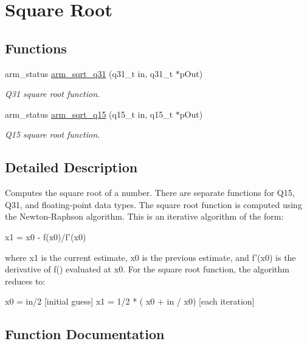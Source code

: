\hypertarget{group___s_q_r_t}{}\section{Square Root}
\label{group___s_q_r_t}
\subsection*{Functions}
\begin{DoxyCompactItemize}
\item 
arm\+\_\+status \hyperlink{group___s_q_r_t_ga119e25831e141d734d7ef10636670058}{arm\+\_\+sqrt\+\_\+q31} (q31\+\_\+t in, q31\+\_\+t $\ast$p\+Out)
\begin{DoxyCompactList}\small\item\em Q31 square root function. \end{DoxyCompactList}\item 
arm\+\_\+status \hyperlink{group___s_q_r_t_ga5abe5ca724f3e15849662b03752c1238}{arm\+\_\+sqrt\+\_\+q15} (q15\+\_\+t in, q15\+\_\+t $\ast$p\+Out)
\begin{DoxyCompactList}\small\item\em Q15 square root function. \end{DoxyCompactList}\end{DoxyCompactItemize}


\subsection{Detailed Description}
Computes the square root of a number. There are separate functions for Q15, Q31, and floating-\/point data types. The square root function is computed using the Newton-\/\+Raphson algorithm. This is an iterative algorithm of the form\+: 
\begin{DoxyPre}
     x1 = x0 - f(x0)/f'(x0)
\end{DoxyPre}
 where {\ttfamily x1} is the current estimate, {\ttfamily x0} is the previous estimate, and {\ttfamily f'(x0)} is the derivative of {\ttfamily f()} evaluated at {\ttfamily x0}. For the square root function, the algorithm reduces to\+: 
\begin{DoxyPre}
    x0 = in/2                         [initial guess]
    x1 = 1/2 * ( x0 + in / x0)        [each iteration]
\end{DoxyPre}
 

\subsection{Function Documentation}
\hypertarget{group___s_q_r_t_ga5abe5ca724f3e15849662b03752c1238}{}
